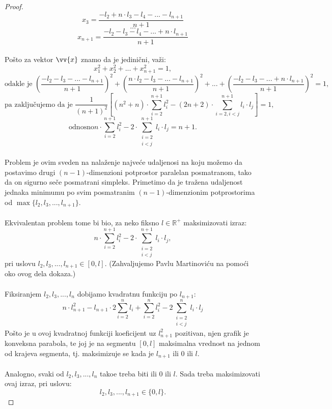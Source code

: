 \documentclass[11pt,letter]{article}
\begin{document}
\begin{proof}
$$x_3=\frac{-l_2+n\cdot l_3-l_4-...-l_{n+1}}{n+1}$$
\vspace{3pt}
$$...$$
\vspace{3pt}
$$x_{n+1}=\frac{-l_2-l_3-l_4-...+n\cdot l_{n+1}}{n+1}$$
\\
\indent Po\v sto za vektor $\vv{x}$ znamo da je jedini\v cni, va\v zi:
$$x_1^2+ x_2^2+...+x_{n+1}^2=1,$$
$$\text{odakle je } \left(\frac{-l_2-l_3-...-l_{n+1}}{n+1}\right)^2+\left(\frac{n\cdot l_2-l_3-...-l_{n+1}}{n+1}\right)^2+...+\left(\frac{-l_2-l_3-...+n\cdot l_{n+1}}{n+1}\right)^2=1,$$
$$\text{pa zaklju\v cujemo da je  }\frac{1}{(n+1)^2}\left[ (n^2+n)\cdot {\sum_{i=2}^{n+1} {l_i^2}} - (2n+2)\cdot {\sum_{i=2, i<j}^{n+1} {l_i\cdot l_j} } \right]=1,$$
$$\text{odnosno} n\cdot {\sum_{i=2}^{n+1} {l_i^2}} - 2\cdot {\sum_{\substack{ i=2\\ i<j}}^{n+1} {l_i\cdot l_j} } =n+1.$$
\\





\indent Problem je ovim sveden na nala\v zenje najve\' ce udaljenosi na koju mo\v zemo da postavimo drugi $(n-1)$-dimenzioni potprostor paralelan posmatranom, tako da on sigurno se\v ce posmatrani simpleks. Primetimo da je tra\v zena udaljenost jednaka minimumu po svim posmatranim $(n-1)$-dimenzionim potprostorima od $\max{\{l_2, l_3,..., l_{n+1}\}}$.
\\
\\
\indent Ekvivalentan problem tome bi bio, za neko fiksno $l\in \mathbb{R}^+$ maksimizovati izraz:
$$n\cdot {\sum_{i=2}^{n+1} {l_i^2}} - 2\cdot {\sum_{\substack{ i=2\\ i<j}}^{n+1} {l_i\cdot l_j} }, $$
pri uslovu $l_2,l_3,..., l_{n+1}\in [0,l]$. (Zahvaljujemo Pavlu Martinovi\' cu na pomo\' ci oko ovog dela dokaza.)
\\
\\
\indent Fiksiranjem $l_2, l_3,..., l_n$ dobijamo kvadratnu funkciju po $l_{n+1}$:
$$n\cdot l_{n+1}^2-l_{n+1}\cdot 2\sum^{n}_{i=2}l_i+\sum^{n}_{i=2}l_i^2-2\sum^{n}_{\substack{ i=2\\ i<j}}l_i\cdot l_j$$
\indent Po\v sto je u ovoj kvadratnoj funkciji koeficijent uz $l_{n+1}^2$ pozitivan, njen grafik je konveksna parabola, te joj je na segmentu $[0,l]$ maksimalna vrednost na jednom od krajeva segmenta, tj. maksimizuje se kada je $l_{n+1}$ ili 0 ili $l$.
\\
\\
\indent Analogno, svaki od $l_2, l_3,..., l_n$ tako\dj e treba biti ili 0 ili $l$. Sada treba maksimizovati ovaj izraz, pri uslovu:
$$l_2, l_3,..., l_{n+1}\in \{0, l\}.$$


\end{proof}
\end{document}
